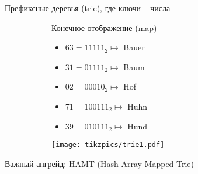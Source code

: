 \begin{frame}{Префиксные деревья (trie), где ключи -- числа}
\begin{figure}[ht]
\begin{subfigure}{.39\textwidth}
Конечное отображение (map)
\begin{itemize}
\item $63=11111_2\mapsto$ Bauer
\item $31=01111_2\mapsto$ Baum
\item $02=00010_2\mapsto$ Hof
\item $71=100111_2\mapsto$ Huhn
\item $39=010111_2\mapsto$ Hund
\end{itemize}
\end{subfigure}
\begin{subfigure}{.59\textwidth}
\texttt{[image: tikzpics/trie1.pdf]}
\end{subfigure}
\end{figure}
\vspace{2em}
Важный апгрейд: HAMT (Hash Array Mapped Trie)
\end{frame}
